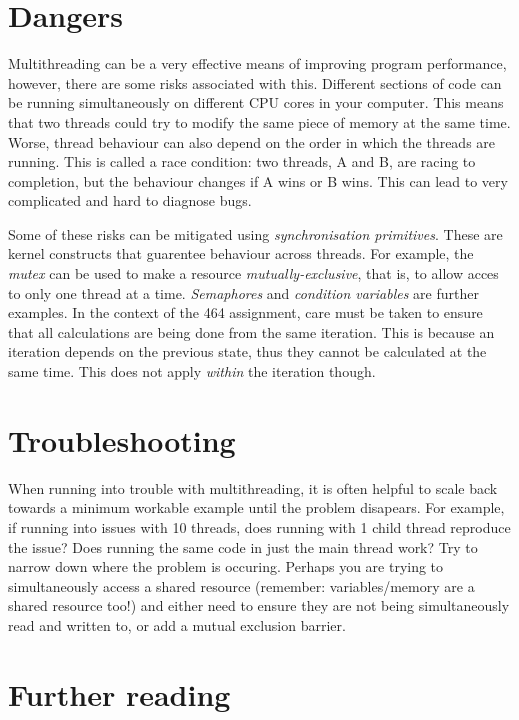 \documentclass[a4paper,11pt]{article}
\begin{document}
\section{Dangers}

Multithreading can be a very effective means of improving program performance,
however, there are some risks associated with this. Different sections of code
can be running simultaneously on different CPU cores in your computer. This
means that two threads could try to modify the same piece of memory at the same
time. Worse, thread behaviour can also depend on the order in which the threads
are running. This is called a race condition: two threads, A and B, are racing
to completion, but the behaviour changes if A wins or B wins. This can lead to
very complicated and hard to diagnose bugs.

Some of these risks can be mitigated using \emph{synchronisation primitives}.
These are kernel constructs that guarentee behaviour across threads. For
example, the \emph{mutex} can be used to make a resource
\emph{mutually-exclusive}, that is, to allow acces to only one thread at a time.
\emph{Semaphores} and \emph{condition variables} are further examples. In the
context of the 464 assignment, care must be taken to ensure that all
calculations are being done from the same iteration. This is because an
iteration depends on the previous state, thus they cannot be calculated at the
same time. This does not apply \emph{within} the iteration though.


\section{Troubleshooting}

When running into trouble with multithreading, it is often helpful to scale back
towards a minimum workable example until the problem disapears. For example, if
running into issues with 10 threads, does running with 1 child thread reproduce
the issue? Does running the same code in just the main thread work? Try to
narrow down where the problem is occuring. Perhaps you are trying to
simultaneously access a shared resource (remember: variables/memory are a shared
resource too!) and either need to ensure they are not being simultaneously read
and written to, or add a mutual exclusion barrier.

\section{Further reading}
\end{document}

